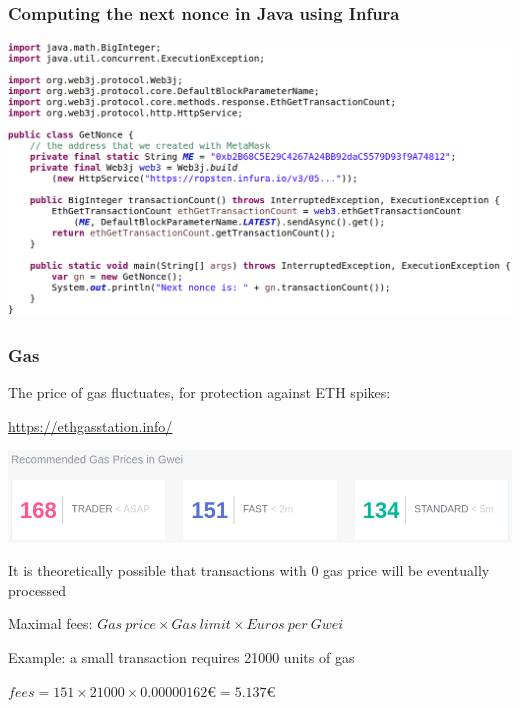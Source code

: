 \documentclass[11pt]{beamer}  %
\begin{document}
\begin{frame}\frametitle{Computing the next nonce in Java using Infura}

  \begin{center}
    \includegraphics[width=\textwidth,clip=false]{pictures/get-nonce-java.png}
  \end{center}

\end{frame}

\begin{frame}\frametitle{Gas}

  The price of gas fluctuates, for protection against ETH spikes:

  \medskip

  \begin{greenbox}{\url{https://ethgasstation.info/}}
    \begin{center}
      \includegraphics[width=\textwidth,clip=false]{pictures/ethgasstation.png}
    \end{center}
  \end{greenbox}

  \bigskip

  It is theoretically possible that transactions with $0$ gas price will be eventually
  processed

  \medskip

  Maximal fees: $\mathit{Gas\ price}\times\mathit{Gas\ limit}
  \times \mathit{Euros\ per\ Gwei}$

  \medskip

  \begin{redbox}{Example: a small transaction requires 21000 units of gas}
    \begin{center}
      $\mathit{fees} = 151\times 21000\times 0.00000162$€$=5.137$€
    \end{center}
  \end{redbox}
  
\end{frame}
\end{document}
